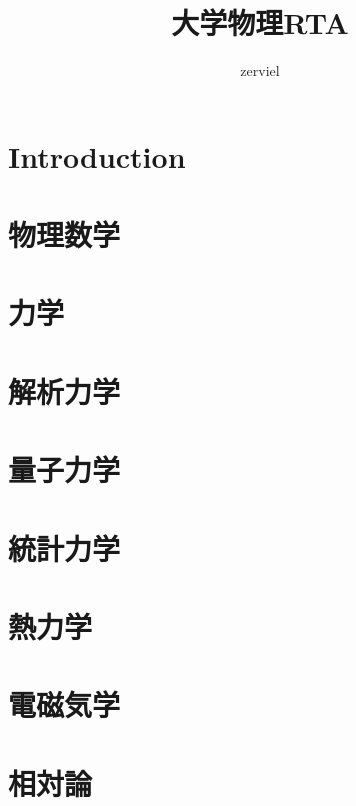 \documentclass[dvipdfmx,a4j,12pt]{jsarticle}
\title{大学物理RTA}
\author{zerviel}
\begin{document}
\maketitle

\part*{Introduction}
        
\part{物理数学}
    
\part{力学}
    
\part{解析力学}
    
\part{量子力学}
    
\part{統計力学}
    
\part{熱力学}

\part{電磁気学}

\part{相対論}
\end{document}
